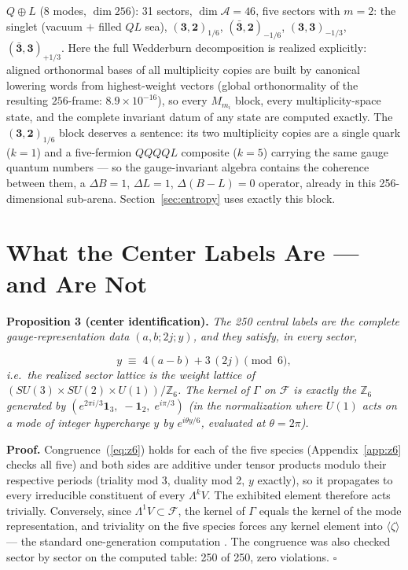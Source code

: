\documentclass[11pt]{article}
\newcommand{\ZZ}{\mathbb{Z}}
\newcommand{\Alg}{\mathcal{A}}
\newcommand{\Fock}{\mathcal{F}}
\newcommand{\rep}[2]{(\mathbf{#1})_{#2}}
\begin{document}
\textbf{$Q\oplus L$} (8 modes, $\dim 256$): 31 sectors, $\dim\Alg = 46$, five sectors with $m=2$: the singlet (vacuum $+$ filled $Q L$ sea), $\rep{3,2}{1/6}$, $(\bar{\mathbf{3}},\mathbf{2})_{-1/6}$, $\rep{3,3}{-1/3}$, $(\bar{\mathbf{3}},\mathbf{3})_{+1/3}$. Here the full Wedderburn decomposition is realized explicitly: aligned orthonormal bases of all multiplicity copies are built by canonical lowering words from highest-weight vectors (global orthonormality of the resulting $256$-frame: $8.9\times10^{-16}$), so every $M_{m_i}$ block, every multiplicity-space state, and the complete invariant datum of any state are computed exactly. The $\rep{3,2}{1/6}$ block deserves a sentence: its two multiplicity copies are a single quark ($k=1$) and a five-fermion $QQQQL$ composite ($k=5$) carrying the same gauge quantum numbers --- so the gauge-invariant algebra contains the coherence between them, a $\Delta B = 1$, $\Delta L = 1$, $\Delta(B{-}L)=0$ operator, already in this 256-dimensional sub-arena. Section~\ref{sec:entropy} uses exactly this block.

\section{What the Center Labels Are --- and Are Not}\label{sec:center}

{\sloppy\noindent\textbf{Proposition 3 (center identification).} \emph{The 250 central labels are the complete gauge-representation data $(a,b;2j;y)$, and they satisfy, in every sector,}\par}
\begin{equation}
y \;\equiv\; 4(a-b) + 3\,(2j) \pmod 6,
\label{eq:z6}
\end{equation}
\emph{i.e.\ the realized sector lattice is the weight lattice of $(SU(3)\times SU(2)\times U(1))/\ZZ_6$. The kernel of $\Gamma$ on $\Fock$ is exactly the $\ZZ_6$ generated by $\left(e^{2\pi i/3}\mathbf{1}_3,\; -\mathbf{1}_2,\; e^{i\pi/3}\right)$ (in the normalization where $U(1)$ acts on a mode of integer hypercharge $y$ by $e^{i\theta y/6}$, evaluated at $\theta = 2\pi$).}

\medskip

\noindent\textbf{Proof.} Congruence~(\ref{eq:z6}) holds for each of the five species (Appendix~\ref{app:z6} checks all five) and both sides are additive under tensor products modulo their respective periods (triality mod 3, duality mod 2, $y$ exactly), so it propagates to every irreducible constituent of every $\Lambda^k V$. The exhibited element therefore acts trivially. Conversely, since $\Lambda^1 V\subset\Fock$, the kernel of $\Gamma$ equals the kernel of the mode representation, and triviality on the five species forces any kernel element into $\langle\zeta\rangle$ --- the standard one-generation computation \cite{tong}. The congruence was also checked sector by sector on the computed table: 250 of 250, zero violations. \hfill$\square$
\end{document}
